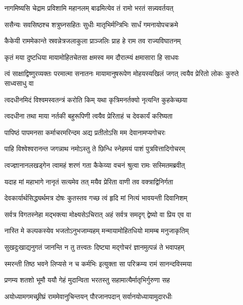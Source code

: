 \twolineshloka
{नागमिष्यसि चेद्राम प्रविशामि महानलम्}
{बाढमित्येव तं रामो भरतं सन्न्यवर्तयत्} %

\twolineshloka
{ससैन्यः सवसिष्ठश्च शत्रुघ्नसहितः सुधीः}
{मातृभिर्मन्त्रिभिः सार्धं गमनायोपचक्रमे} %

\twolineshloka
{कैकेयी राममेकान्ते स्रवन्नेत्रजलाकुला}
{प्राञ्जलिः प्राह हे राम तव राज्यविघातनम्} %

\twolineshloka
{कृतं मया दुष्टधिया मायामोहितचेतसा}
{क्षमस्व मम दौरात्म्यं क्षमासारा हि साधवः} %

\threelineshloka
{त्वं साक्षाद्विष्णुरव्यक्तः परमात्मा सनातनः}
{मायामानुषरूपेण मोहयस्यखिलं जगत्}
{त्वयैव प्रेरितो लोकः कुरुते साध्वसाधु वा} %

\twolineshloka
{त्वदधीनमिदं विश्वमस्वतन्त्रं करोति किम्}
{यथा कृत्रिमनर्तक्यो नृत्यन्ति कुहकेच्छया} %

\twolineshloka
{त्वदधीना तथा माया नर्तकी बहुरूपिणी}
{त्वयैव प्रेरिताहं च देवकार्यं करिष्यता} %

\twolineshloka
{पापिष्ठं पापमनसा कर्माचरमरिन्दम}
{अद्य प्रतीतोऽसि मम देवानामप्यगोचरः} %

\twolineshloka
{पाहि विश्वेश्वरानन्त जगन्नाथ नमोऽस्तु ते}
{छिन्धि स्नेहमयं पाशं पुत्रवित्तादिगोचरम्} %

\twolineshloka
{त्वज्ज्ञानानलखड्गेन त्वामहं शरणं गता}
{कैकेय्या वचनं श्रुत्वा रामः सस्मितमब्रवीत्} %

\twolineshloka
{यदाह मां महाभागे नानृतं सत्यमेव तत्}
{मयैव प्रेरिता वाणी तव वक्त्राद्विनिर्गता} %

\twolineshloka
{देवकार्यार्थसिद्ध्यर्थमत्र दोषः कुतस्तव}
{गच्छ त्वं हृदि मां नित्यं भावयन्ती दिवानिशम्} %

\twolineshloka
{सर्वत्र विगतस्नेहा मद्भक्त्या मोक्ष्यसेऽचिरात्}
{अहं सर्वत्र समदृग् द्वेष्यो वा प्रिय एव वा} %

\twolineshloka
{नास्ति मे कल्पकस्येव भजतोऽनुभजाम्यहम्}
{मन्मायामोहितधियो मामम्ब मनुजाकृतिम्} %

\twolineshloka
{सुखदुःखाद्यनुगतं जानन्ति न तु तत्त्वतः}
{दिष्ट्या मद्गोचरं ज्ञानमुत्पन्नं ते भवापहम्} %

\twolineshloka
{स्मरन्ती तिष्ठ भवने लिप्यसे न च कर्मभिः}
{इत्युक्ता सा परिक्रम्य रामं सानन्दविस्मया} %

\twolineshloka
{प्रणम्य शतशो भूमौ ययौ गेहं मुदान्विता}
{भरतस्तु सहामात्यैर्मातृभिर्गुरुणा सह} %

\twolineshloka
{अयोध्यामगमच्छ्रीघ्रं राममेवानुचिन्तयन्}
{पौरजानपदान् सर्वानयोध्यायामुदारधीः} %

